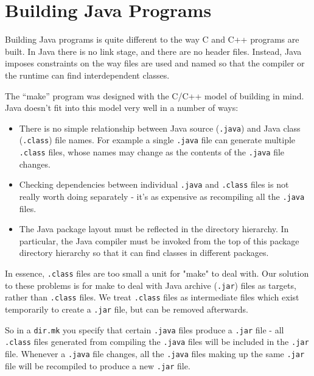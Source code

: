 \documentclass[11pt,twoside,onecolumn]{article}
\begin{document}
\section{Building Java Programs}

Building Java programs is quite different to the way C and C++ programs are
built.  In Java there is no link stage, and there are no header files.
Instead, Java imposes constraints on the way files are used and named so that
the compiler or the runtime can find interdependent classes.

The ``make'' program was designed with the C/C++ model of building in mind.
Java doesn't fit into this model very well in a number of ways:

\begin{itemize}

\item There is no simple relationship between Java source (\verb|.java|) and
Java class (\verb|.class|) file names.  For example a single \verb|.java| file
can generate multiple \verb|.class| files, whose names may change as the
contents of the \verb|.java| file changes.

\item Checking dependencies between individual \verb|.java| and \verb|.class|
files is not really worth doing separately - it's as expensive as recompiling
all the \verb|.java| files.

\item The Java package layout must be reflected in the directory hierarchy.  In
particular, the Java compiler must be invoked from the top of this package
directory hierarchy so that it can find classes in different packages.

\end{itemize}

In essence, \verb|.class| files are too small a unit for "make" to deal with.
Our solution to these problems is for make to deal with Java archive
(\verb|.jar|) files as targets, rather than \verb|.class| files.  We treat
\verb|.class| files as intermediate files which exist temporarily to create a
\verb|.jar| file, but can be removed afterwards.

So in a {\tt dir.mk} you specify that certain \verb|.java| files produce a
\verb|.jar| file - all \verb|.class| files generated from compiling the
\verb|.java| files will be included in the \verb|.jar| file.  Whenever a
\verb|.java| file changes, all the \verb|.java| files making up the same
\verb|.jar| file will be recompiled to produce a new \verb|.jar| file.
\end{document}
